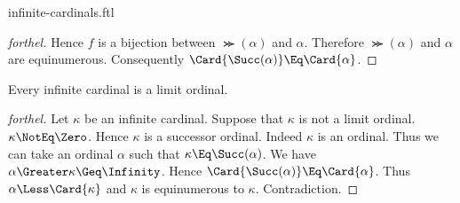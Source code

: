 \documentclass{stex}
\begin{document}
\begin{smodule}{infinite-cardinals.ftl}
\begin{proof}[forthel]
  Hence $f$ is a bijection between $\Succ(\alpha)$ and $\alpha$.
  Therefore $\Succ(\alpha)$ and $\alpha$ are equinumerous.
  Consequently $\Card{\Succ(\alpha)} \Eq \Card{\alpha}$.
\end{proof}

\begin{proposition*}[forthel]
  Every infinite cardinal is a limit ordinal.
\end{proposition*}
\begin{proof}[forthel]
  Let $\kappa$ be an infinite cardinal.
  Suppose that $\kappa$ is not a limit ordinal.
  $\kappa \NotEq \Zero$.
  Hence $\kappa$ is a successor ordinal.
  Indeed $\kappa$ is an ordinal.
  Thus we can take an ordinal $\alpha$ such that $\kappa \Eq \Succ(\alpha)$.
  We have $\alpha \Greater \kappa \Geq \Infinity$.
  Hence $\Card{\Succ(\alpha)} \Eq \Card{\alpha}$.
  Thus $\alpha \Less \Card{\kappa}$ and $\kappa$ is equinumerous to $\kappa$.
  Contradiction.
\end{proof}

\end{smodule}
\end{document}
